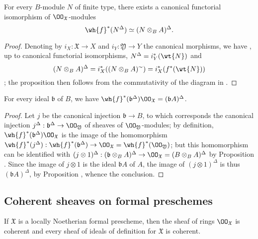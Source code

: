\begin{prop}[10.10.8]
\label{1.10.10.8}
For every $B$-module $N$ of finite type, there exists a canonical functorial isomorphism of $\OO_\mathfrak{X}$-modules
\[
  \wh{f}^*(N^\Delta)\isoto(N\otimes_B A)^\Delta.
\]
\end{prop}

\begin{proof}
\label{proof-1.10.10.8}
Denoting by $i_X:\mathfrak{X}\to X$ and $i_Y:\mathfrak{Y}\to Y$ the canonical morphisms, we have , up to canonical functorial isomorphisms, $N^\Delta=i_Y^*(\wt{N})$ and
\[
  (N\otimes_B A)^\Delta=i_X^*((N\otimes_B A)^\sim)=i_X^*(f^*(\wt{N}))
\]
; the proposition then follows from the commutativity of the diagram in .
\end{proof}

\begin{cor}
\label{1.10.10.9}
For every ideal $\mathfrak{b}$ of $B$, we have $\wh{f}^*(\mathfrak{b}^\Delta)\OO_\mathfrak{X}=(\mathfrak{b}A)^\Delta$.
\end{cor}

\begin{proof}
\label{proof-1.10.10.9}
Let $j$ be the canonical injection $\mathfrak{b}\to B$, to which corresponds the canonical injection $j^\Delta:\mathfrak{b}^\Delta\to\OO_\mathfrak{Y}$ of sheaves of $\OO_\mathfrak{Y}$-modules; by definition, $\wh{f}^*(\mathfrak{b}^\Delta)\OO_\mathfrak{X}$ is the image of the homomorphism $\wh{f}^*(j^\Delta):\wh{f}^*(\mathfrak{b}^\Delta)\to\OO_\mathfrak{X}=\wh{f}^*(\OO_\mathfrak{Y})$; but this homomorphism can be identified with $(j\otimes 1)^\Delta:(\mathfrak{b}\otimes_B A)^\Delta\to\OO_\mathfrak{X}=(B\otimes_B A)^\Delta$ by Proposition .
Since the image of $j\otimes 1$ is the ideal $\mathfrak{b}A$ of $A$, the image of $(j\otimes 1)^\Delta$ is thus $(\mathfrak{b}A)^\Delta$, by Proposition , whence the conclusion.
\end{proof}

\subsection{Coherent sheaves on formal preschemes}
\label{subsection:1.10.11}

\begin{prop}[10.11.1]
\label{1.10.11.1}
If $\mathfrak{X}$ is a locally Noetherian formal prescheme, then the sheaf of rings $\OO_\mathfrak{X}$ is coherent and every sheaf of ideals of definition for $\mathfrak{X}$ is coherent.
\end{prop}

